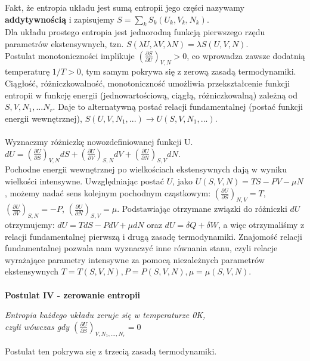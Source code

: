 \documentclass[12pt,a4paper,openright]{report} %
\begin{document}
Fakt, że entropia układu jest sumą entropii jego części nazywamy \textbf{addytywnością} i zapisujemy $S=\sum\limits_{k} S_k(U_k, V_k, N_k)$. \\
Dla układu prostego entropia jest jednorodną funkcją pierwszego rzędu parametrów ekstensywnych, tzn. $S(\lambda U, \lambda V, \lambda N)=\lambda S(U, V, N)$. \\
Postulat monotoniczności implikuje $\left( \frac{\partial S}{\partial U} \right)_{V,N}>0$, co wprowadza zawsze dodatnią temperaturę $1/T >0$, tym samym pokrywa się z zerową zasadą termodynamiki.\\
Ciągłość, różniczkowalność, monotoniczność umożliwia przekształcenie funkcji entropii w funkcję energii (jednowartościową, ciągłą, różniczkowalną) zależną od $S, V, N_1,...N_r $. Daje to alternatywną postać relacji fundamentalnej (postać funkcji energii wewnętrznej), $S(U, V, N_1, ...) \rightarrow U(S, V, N_1,...)$. \\
\\
Wyznaczmy różniczkę nowozdefiniowanej funkcji U. \\
$dU=\left( \frac{\partial U}{\partial S} \right)_{V, N} dS + \left( \frac{\partial U}{\partial V} \right)_{S, N} dV + \left( \frac{\partial U}{\partial N} \right)_{S, V} dN$. \\
Pochodne energii wewnętrznej po wielkościach ekstensywnych dają w wyniku wielkości intensywne. Uwzględniając postać $U$, jako $U(S, V, N) = TS - PV - \mu N$, możemy nadać sens kolejnym pochodnym cząstkowym: $\left( \frac{\partial U}{\partial S} \right)_{N,V}=T$, $\left( \frac{\partial U}{\partial V} \right)_{S,N}=-P$, $\left( \frac{\partial U}{\partial N} \right)_{S,V}=\mu$. Podstawiając otrzymane związki do różniczki $dU$ otrzymujemy: $dU=TdS-PdV+\mu dN$ oraz $dU = \delta Q + \delta W$, a więc otrzymaliśmy z relacji fundamentalnej pierwszą i drugą zasadę termodynamiki. Znajomość relacji fundamentalnej pozwala nam wyznaczyć inne równania stanu, czyli relacje wyrażające parametry intensywne za pomocą niezależnych parametrów ekstensywnych $T=T(S, V, N), P=P(S, V, N), \mu = \mu(S, V, N)$.\\
\\
\textbf{Postulat IV - zerowanie entropii}
\begin{center}
\textit{Entropia każdego układu zeruje się w temperaturze 0K, \\ czyli wówczas gdy $\left( \frac{\partial U}{\partial S} \right)_{V, N_1,...,N_r}=0$
}
\end{center}
Postulat ten pokrywa się z trzecią zasadą termodynamiki.\\
\end{document}
